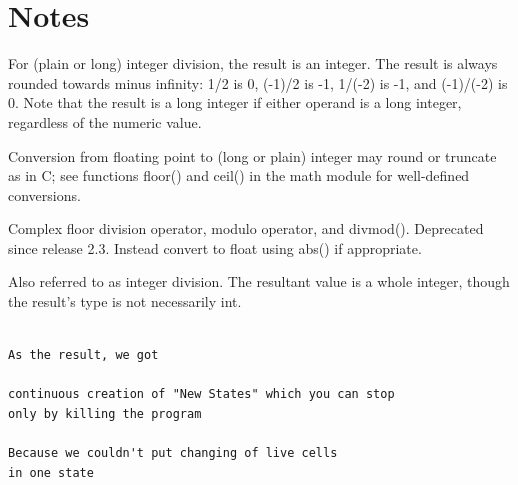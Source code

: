 \documentclass{tufte-handout}
\begin{document}
\section{Notes}
For (plain or long) integer division, the result is an integer. The result is always rounded towards minus infinity: 1/2 is 0, (-1)/2 is -1, 1/(-2) is -1, and (-1)/(-2) is 0. Note that the result is a long integer if either operand is a long integer, regardless of the numeric value.

Conversion from floating point to (long or plain) integer may round or truncate as in C; see functions floor() and ceil() in the math module for well-defined conversions.

Complex floor division operator, modulo operator, and divmod().
Deprecated since release 2.3. Instead convert to float using abs() if appropriate.

Also referred to as integer division. The resultant value is a whole integer, though the result's type is not necessarily int.





\begin{shaded}
\begin{verbatim}

As the result, we got 

continuous creation of "New States" which you can stop
only by killing the program 

Because we couldn't put changing of live cells 
in one state

\end{verbatim}
\end{shaded}
\end{document}
